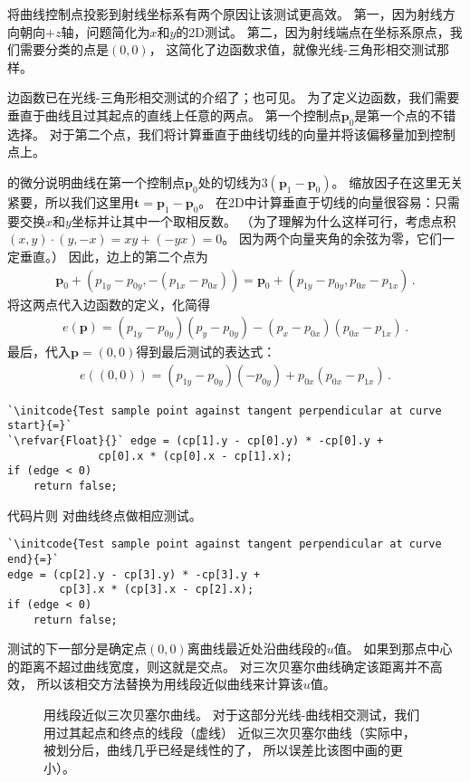将曲线控制点投影到射线坐标系有两个原因让该测试更高效。
第一，因为射线方向朝向$+z$轴，问题简化为$x$和$y$的2D测试。
第二，因为射线端点在坐标系原点，我们需要分类的点是$(0,0)$，
这简化了边函数求值，就像光线-三角形相交测试那样。

边函数已在光线-三角形相交测试的介绍了；也可见。
为了定义边函数，我们需要垂直于曲线且过其起点的直线上任意的两点。
第一个控制点$\bm p_0$是第一个点的不错选择。
对于第二个点，我们将计算垂直于曲线切线的向量并将该偏移量加到控制点上。

的微分说明曲线在第一个控制点$\bm p_0$处的切线为$3(\bm p_1-\bm p_0)$。
缩放因子在这里无关紧要，所以我们这里用$\bm t=\bm p_1-\bm p_0$。
在2D中计算垂直于切线的向量很容易：只需要交换$x$和$y$坐标并让其中一个取相反数。
（为了理解为什么这样可行，考虑点积$(x,y)\cdot(y,-x)=xy+(-yx)=0$。
因为两个向量夹角的余弦为零，它们一定垂直。）
因此，边上的第二个点为
\begin{align*}
    \bm p_0+(p_{1y}-p_{0y},-(p_{1x}-p_{0x}))=\bm p_0+(p_{1y}-p_{0y},p_{0x}-p_{1x})\, .
\end{align*}
将这两点代入边函数的定义，化简得
\begin{align*}
    e(\bm p)=(p_{1y}-p_{0y})(p_y-p_{0y})-(p_x-p_{0x})(p_{0x}-p_{1x})\, .
\end{align*}
最后，代入$\bm p=(0,0)$得到最后测试的表达式：
\begin{align*}
    e((0,0))=(p_{1y}-p_{0y})(-p_{0y})+p_{0x}(p_{0x}-p_{1x})\, .
\end{align*}
\begin{lstlisting}
`\initcode{Test sample point against tangent perpendicular at curve start}{=}`
`\refvar{Float}{}` edge = (cp[1].y - cp[0].y) * -cp[0].y +
              cp[0].x * (cp[0].x - cp[1].x);
if (edge < 0)
    return false;
\end{lstlisting}

代码片则
对曲线终点做相应测试。
\begin{lstlisting}
`\initcode{Test sample point against tangent perpendicular at curve end}{=}`
edge = (cp[2].y - cp[3].y) * -cp[3].y +
        cp[3].x * (cp[3].x - cp[2].x);
if (edge < 0)
    return false;
\end{lstlisting}

测试的下一部分是确定点$(0,0)$离曲线最近处沿曲线段的$u$值。
如果到那点中心的距离不超过曲线宽度，则这就是交点。
对三次贝塞尔曲线确定该距离并不高效，
所以该相交方法替换为用线段近似曲线来计算该$u$值。
\begin{figure}[htbp]
    \centering
    \caption{用线段近似三次贝塞尔曲线。
        对于这部分光线-曲线相交测试，我们用过其起点和终点的线段（虚线）
        近似三次贝塞尔曲线（实际中，被划分后，曲线几乎已经是线性的了，
        所以误差比该图中画的更小）。}
    \label{fig:3.22}
\end{figure}

